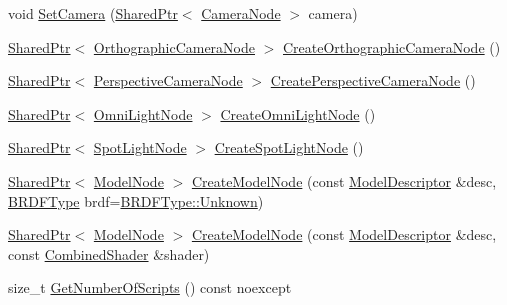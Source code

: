 \begin{DoxyCompactItemize}
\item 
void \hyperlink{classmage_1_1_scene_a7568ec0884d04812af2f70990c8ec80d}{Set\+Camera} (\hyperlink{namespacemage_a1e01ae66713838a7a67d30e44c67703e}{Shared\+Ptr}$<$ \hyperlink{classmage_1_1_camera_node}{Camera\+Node} $>$ camera)
\item 
\hyperlink{namespacemage_a1e01ae66713838a7a67d30e44c67703e}{Shared\+Ptr}$<$ \hyperlink{namespacemage_a7d62ab5877be3e14a9735014b77d3f55}{Orthographic\+Camera\+Node} $>$ \hyperlink{classmage_1_1_scene_a9ed9e3a611434f62427c7bd4c16d2456}{Create\+Orthographic\+Camera\+Node} ()
\item 
\hyperlink{namespacemage_a1e01ae66713838a7a67d30e44c67703e}{Shared\+Ptr}$<$ \hyperlink{namespacemage_ad6f2ef4a25873e73e8fa38b06425939f}{Perspective\+Camera\+Node} $>$ \hyperlink{classmage_1_1_scene_a3f4141d407133e6419af92376bc3ecc1}{Create\+Perspective\+Camera\+Node} ()
\item 
\hyperlink{namespacemage_a1e01ae66713838a7a67d30e44c67703e}{Shared\+Ptr}$<$ \hyperlink{namespacemage_a1724c6e6b6b5ba535cdd967cbbb4a669}{Omni\+Light\+Node} $>$ \hyperlink{classmage_1_1_scene_a370f5ce63a6277a1369c1545f0acbffa}{Create\+Omni\+Light\+Node} ()
\item 
\hyperlink{namespacemage_a1e01ae66713838a7a67d30e44c67703e}{Shared\+Ptr}$<$ \hyperlink{namespacemage_aeed5dee4ff6c591eabb0e9114256df4a}{Spot\+Light\+Node} $>$ \hyperlink{classmage_1_1_scene_a27ffb510eeb8e208ba20ee0d76138a3f}{Create\+Spot\+Light\+Node} ()
\item 
\hyperlink{namespacemage_a1e01ae66713838a7a67d30e44c67703e}{Shared\+Ptr}$<$ \hyperlink{classmage_1_1_model_node}{Model\+Node} $>$ \hyperlink{classmage_1_1_scene_a5928fe1e71e816f6b13d055ee5dfa239}{Create\+Model\+Node} (const \hyperlink{classmage_1_1_model_descriptor}{Model\+Descriptor} \&desc, \hyperlink{namespacemage_ae7a7a03a7b34d7e2689689bb8295cd38}{B\+R\+D\+F\+Type} brdf=\hyperlink{namespacemage_ae7a7a03a7b34d7e2689689bb8295cd38a88183b946cc5f0e8c96b2e66e1c74a7e}{B\+R\+D\+F\+Type\+::\+Unknown})
\item 
\hyperlink{namespacemage_a1e01ae66713838a7a67d30e44c67703e}{Shared\+Ptr}$<$ \hyperlink{classmage_1_1_model_node}{Model\+Node} $>$ \hyperlink{classmage_1_1_scene_ae21a831a792ab16b1459cfa8b65a2508}{Create\+Model\+Node} (const \hyperlink{classmage_1_1_model_descriptor}{Model\+Descriptor} \&desc, const \hyperlink{structmage_1_1_combined_shader}{Combined\+Shader} \&shader)
\item 
size\+\_\+t \hyperlink{classmage_1_1_scene_a33cecd2fd2b393ccac84b94ec8cc53c0}{Get\+Number\+Of\+Scripts} () const noexcept

\end{DoxyCompactItemize}
